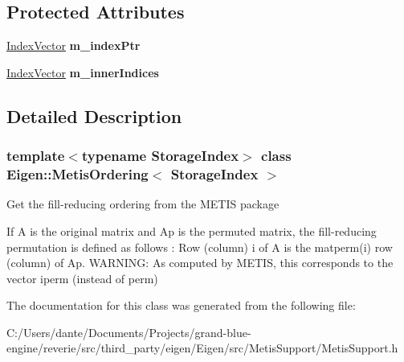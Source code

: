 \subsection*{Protected Attributes}
\begin{DoxyCompactItemize}
\item 
\mbox{\label{class_eigen_1_1_metis_ordering_aad9795eab17371180f140e344c2c3e36}} 
\mbox{\hyperlink{class_eigen_1_1_matrix}{Index\+Vector}} {\bfseries m\+\_\+index\+Ptr}
\item 
\mbox{\label{class_eigen_1_1_metis_ordering_ad094d620880147d0c138eb2d1790ab32}} 
\mbox{\hyperlink{class_eigen_1_1_matrix}{Index\+Vector}} {\bfseries m\+\_\+inner\+Indices}
\end{DoxyCompactItemize}


\subsection{Detailed Description}
\subsubsection*{template$<$typename Storage\+Index$>$\newline
class Eigen\+::\+Metis\+Ordering$<$ Storage\+Index $>$}

Get the fill-\/reducing ordering from the M\+E\+T\+IS package

If A is the original matrix and Ap is the permuted matrix, the fill-\/reducing permutation is defined as follows \+: Row (column) i of A is the matperm(i) row (column) of Ap. W\+A\+R\+N\+I\+NG\+: As computed by M\+E\+T\+IS, this corresponds to the vector iperm (instead of perm) 

The documentation for this class was generated from the following file\+:\begin{DoxyCompactItemize}
\item 
C\+:/\+Users/dante/\+Documents/\+Projects/grand-\/blue-\/engine/reverie/src/third\+\_\+party/eigen/\+Eigen/src/\+Metis\+Support/Metis\+Support.\+h\end{DoxyCompactItemize}
